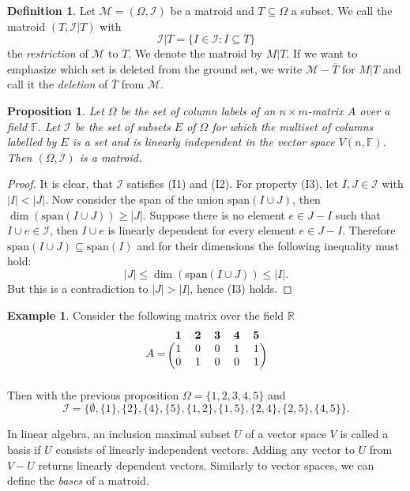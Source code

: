 \documentclass[12pt,a4paper, twoside, autooneside=false]{scrartcl}
\newtheorem{proposition}[theorem]{Proposition}
\theoremstyle{definition}
\newtheorem{definition}[theorem]{Definition}
\newtheorem{beispiel}[theorem]{Example}
\theoremstyle{remark}
\numberwithin{equation}{section}
\newcommand{\M}{\mathcal{M}} %
\begin{document}
\begin{definition}
Let $\M = (\Omega, \mathcal{I})$ be a matroid and $T \subseteq \Omega$ a subset. We call the matroid $(T, \mathcal{I}|T)$ with 
\[
\mathcal{I}|T = \{I \in \mathcal{I}: I \subseteq T\}
\]
the \textit{restriction} of $\M$ to $T$. We denote the matroid by $M|T$. If we want to emphasize which set is deleted from the ground set, we write $\M - \overline{T}$ for $M |T$ and call it the \textit{deletion} of $\overline{T}$ from $\M$. 
\end{definition}
\begin{proposition}
Let $\Omega$ be the set of column labels of an $n \times m$-matrix $A$ over a field $\mathbb{F}$. Let $\mathcal{I}$ be the set of subsets $E$ of $\Omega$ for which the multiset of columns labelled by $E$ is a set and is linearly independent in the vector space $V(n, \mathbb{F})$. Then $(\Omega, \mathcal{I})$ is a matroid.
\end{proposition}
\begin{proof}
It is clear, that $\mathcal{I}$ satisfies (I1) and (I2). For property (I3), let $I, J \in \mathcal{I}$ with $|I| < |J|$. Now consider the span of the union $\mathrm{span}(I \cup J)$, then $\dim(\mathrm{span}(I \cup J))\geq |J|$. Suppose there is no element $e \in J - I$ such that $I \cup e \in \mathcal{I}$, then $I \cup e$ is linearly dependent for every element $e \in J - I$. Therefore $\mathrm{span}(I \cup J) \subseteq \mathrm{span}(I)$ and for their dimensions the following inequality must hold: 
\[
|J| \leq \dim(\mathrm{span}(I \cup J)) \leq |I|.
\]
But this is a contradiction to $|J| > |I|$, hence (I3) holds.
\end{proof}
\begin{beispiel}Consider the following matrix over the field $\mathbb{R}$
\[ A = 
\begin{blockarray}{ccccc}
\mathbf{1} & \mathbf{2} & \mathbf{3} & \mathbf{4} & \mathbf{5} \\ 
\begin{block}{(ccccc)}
  1 & 0 & 0 & 1 & 1 \\
  0 & 1 & 0 & 0 & 1 \\
\end{block}
\end{blockarray}
 \]
Then with the previous proposition $\Omega = \{1,2,3,4,5\}$ and
\[\mathcal{I} = \{\emptyset, \{1\}, \{2\},\{4\}, \{5\}, \{1,2\}, \{1,5\}, \{2,4\}, \{2,5\}, \{4,5\}\}. \]
\end{beispiel}
In linear algebra, an inclusion maximal subset $U$ of a vector space $V$ is called a basis if $U$ consists of linearly independent vectors. Adding any vector to $U$ from $V - U$ returns linearly dependent vectors. Similarly to vector spaces, we can define the \textit{bases} of a matroid. 
\end{document}

